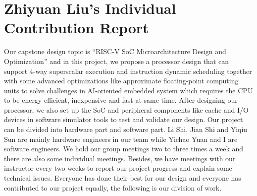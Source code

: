 \chapter*{Zhiyuan Liu's Individual Contribution Report}

Our capstone design topic is ``RISC-V SoC Microarchitecture Design and Optimization'' and in this project, we propose a processor design that can support 4-way superscalar execution and instruction dynamic scheduling together with some advanced optimizations like approximate floating-point computing units to solve challenges in AI-oriented embedded system which requires the CPU to be energy-efficient, inexpensive and fast at same time. After designing our processor, we also set up the SoC and peripheral components like cache and I/O devices in software simulator tools to test and validate our design. Our project can be divided into hardware part and software part. Li Shi, Jian Shi and Yiqiu Sun are mainly hardware engineers in our team while Yichao Yuan and I are software engineers. We hold our group meetings two to three times a week and there are also some individual meetings. Besides, we have meetings with our instructor every two weeks to report our project progress and explain some technical issues. Everyone has done their best for our design and everyone has contributed to our project equally, the following is our division of work.

